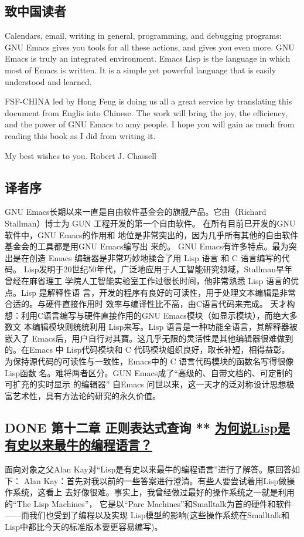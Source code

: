 \documentclass[11pt]{ctexart}
\begin{document}
\subsection{致中国读者}
\label{sec:orgde38ccb}
Calendars, email, writing in general, programming, and debugging programs: GNU
Emacs gives you tools for all these actions, and gives you even more. GNU Emacs
is truly an integrated environment. Emacs Lisp is the language in which most of
Emacs is written. It is a simple yet powerful language that is easily understood
and learned.

FSF-CHINA led by Hong Feng is doing us all a great service by translating this
   document from Englis into Chinese. The work will bring the joy, the
   efficiency, and the power of GNU Emacs to amy people. I hope you will gain as
   much from reading this book as I did from writing it.

My best wishes to you. Robert J. Chassell
\subsection{译者序}
\label{sec:org7902158}
GNU Emacs长期以来一直是自由软件基金会的旗舰产品。它由（Richard Stallman）博士为
   GUN 工程开发的第一个自由软件。 在所有目前已开发的GNU软件中，GNU Emacs的作用和
   地位是非常突出的，因为几乎所有其他的自由软件基金会的工具都是用GNU Emacs编写出
   来的。
GNU Emacs有许多特点。最为突出是在创造 Emacs 编辑器是非常巧妙地揉合了用 Lisp 语言
   和 C 语言编写的代码。
Lisp发明于20世纪50年代，广泛地应用于人工智能研究领域，Stallman早年曾经在麻省理工
   学院人工智能实验室工作过很长时间，他非常熟悉 Lisp 语言的优点。Lisp 是解释性语
   言，开发的程序有良好的可读性，用于处理文本编辑是非常合适的。与硬件直接作用时
   效率与编译性比不高，由C语言代码来完成。
天才构想：利用C语言编写与硬件直接作用的GNU Emacs模块（如显示模块），而绝大多数文
   本编辑模块则统统利用 Lisp来写。Lisp 语言是一种功能全语言，其解释器被嵌入了
   Emacs后，用户自行对其寶。这几乎无限的灵活性是其他编辑器很难做到的。在Emacs 中
   Lisp代码模块和 C 代码模块组织良好，取长补短，相得益彰。
为保持源代码的可读性与一致性，Emacs中的 C 语言代码模块的函数名写得很像 Lisp函数
   名。难将两者区分。GUN Emacs成了“高级的、自带文档的、可定制的可扩充的实时显示
   的编辑器”
自Emacs 问世以来，这一天才的泛对称设计思想极富艺术性，具有方法论的研究的永久价值。
\subsection{{\bfseries\sffamily DONE} 第十二章 正则表达式查询 ** \href{http://www.hao123.com/mid/14816051782311469487?key=\&from=tuijian\&pn=1}{为何说Lisp是有史以来最牛的编程语言？}}
\label{sec:orge704847}
面向对象之父Alan Kay对“Lisp是有史以来最牛的编程语言”进行了解答。原回答如下：
Alan Kay：首先对我以前的一些答案进行澄清。有些人要尝试着用Lisp做操作系统，这看上
去好像很难。事实上，我曾经做过最好的操作系统之一就是利用的“The Lisp Machines”，
它是以“Parc Machines”和Smalltalk为首的硬件和软件——而我们也受到了编程以及实现
Lisp模型的影响(这些操作系统在Smalltalk和Lisp中都比今天的标准版本要更容易编写)。
\end{document}
